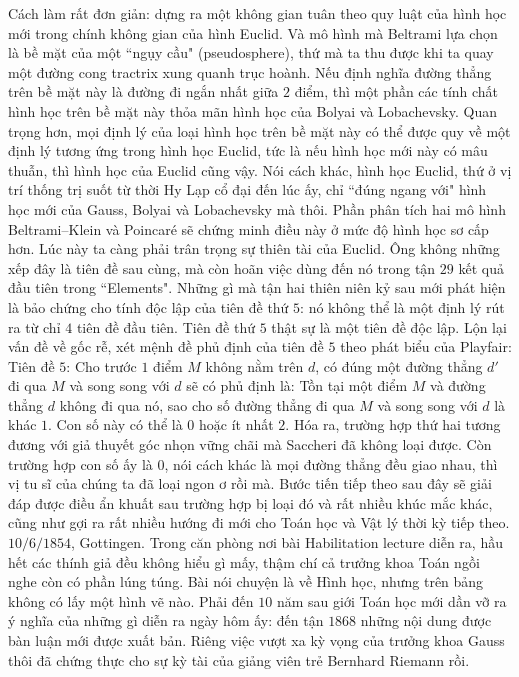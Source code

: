 \begin{multicols}{2}
	\vskip 0.1cm
	Cách làm rất đơn giản: dựng ra một không gian tuân theo quy luật của hình học mới trong chính không gian của hình Euclid. Và mô hình mà Beltrami lựa chọn là bề mặt của một ``ngụy cầu" (pseudosphere), thứ mà ta thu được khi ta quay một đường cong tractrix xung quanh trục hoành. Nếu định nghĩa đường thẳng trên bề mặt này là đường đi ngắn nhất giữa $2$ điểm, thì một phần các tính chất hình học trên bề mặt này thỏa mãn hình học của Bolyai và Lobachevsky. 
	\vskip 0.1cm
	Quan trọng hơn, mọi định lý của loại hình học trên bề mặt này có thể được quy về một định lý tương ứng trong hình học Euclid, tức là nếu hình học mới này có mâu thuẫn, thì hình học của Euclid cũng vậy. Nói cách khác, hình học Euclid, thứ ở vị trí thống trị suốt từ thời Hy Lạp cổ đại đến lúc ấy, chỉ ``đúng ngang với" hình học mới của Gauss, Bolyai và Lobachevsky mà thôi. Phần phân tích hai mô hình Beltrami--Klein và Poincaré sẽ chứng minh điều này ở mức độ hình học sơ cấp hơn.
	\vskip 0.1cm
	Lúc này ta càng phải trân trọng sự thiên tài của Euclid. Ông không những xếp đây là tiên đề sau cùng, mà còn hoãn việc dùng đến nó trong tận $29$ kết quả đầu tiên trong ``Elements". Những gì mà tận hai thiên niên kỷ sau mới phát hiện là bảo chứng cho tính độc lập của tiên đề thứ $5$: nó không thể là một định lý rút ra từ chỉ $4$ tiên đề đầu tiên. Tiên đề thứ $5$ thật sự là một tiên đề độc lập.
	\vskip 0.1cm
	Lộn lại vấn đề về gốc rễ, xét mệnh đề phủ định của tiên đề $5$ theo phát biểu của Playfair:
	\vskip 0.1cm
	Tiên đề $5$: Cho trước $1$ điểm $M$ không nằm trên $d$, có đúng một đường thẳng $d'$ đi qua $M$ và song song với $d$
	\vskip 0.1cm
	sẽ có phủ định là: 
	\vskip 0.1cm
	Tồn tại một điểm $M$ và đường thẳng $d$ không đi qua nó, sao cho số đường thẳng đi qua $M$ và song song với $d$ là khác $1$. Con số này có thể là $0$ hoặc ít nhất $2$. 
	\vskip 0.1cm
	Hóa ra, trường hợp thứ hai tương đương với giả thuyết góc nhọn vững chãi mà Saccheri đã không loại được. Còn trường hợp con số ấy là $0$, nói cách khác là mọi đường thẳng đều giao nhau, thì vị tu sĩ của chúng ta đã loại ngon ơ rồi mà. 
	Bước tiến tiếp theo sau đây sẽ giải đáp được điều ẩn khuất sau trường hợp bị loại đó và rất nhiều khúc mắc khác, cũng như gợi ra rất nhiều hướng đi mới cho Toán học và Vật lý thời kỳ tiếp theo.  
	\vskip 0.1cm
	$10/6/1854$, Gottingen. Trong căn phòng nơi bài Habilitation lecture diễn ra, hầu hết các thính giả đều không hiểu gì mấy, thậm chí cả trưởng khoa Toán ngồi nghe còn có phần lúng túng. Bài nói chuyện là về Hình học, nhưng trên bảng không có lấy một hình vẽ nào. Phải đến $10$ năm sau giới Toán học mới dần vỡ ra ý nghĩa của những gì diễn ra ngày hôm ấy: đến tận $1868$ những nội dung được bàn luận mới được xuất bản. Riêng việc vượt xa kỳ vọng của trưởng khoa Gauss thôi đã chứng thực cho sự kỳ tài của giảng viên trẻ Bernhard Riemann rồi.

\end{multicols}
